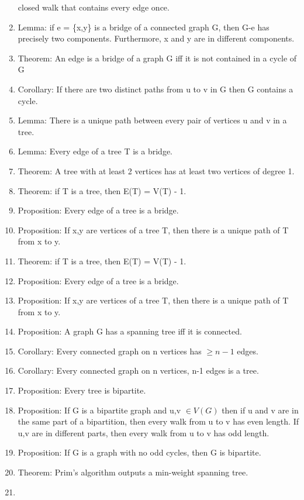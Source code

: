 \documentclass[]{article}
\begin{document}
\begin{enumerate}
  closed walk that contains every edge once.
\item
  Lemma: if e = \{x,y\} is a bridge of a connected graph G, then G-e has
  precisely two components. Furthermore, x and y are in different
  components.
\item
  Theorem: An edge is a bridge of a graph G iff it is not contained in a
  cycle of G
\item
  Corollary: If there are two distinct paths from u to v in G then G
  contains a cycle.
\item
  Lemma: There is a unique path between every pair of vertices u and v
  in a tree.
\item
  Lemma: Every edge of a tree T is a bridge.
\item
  Theorem: A tree with at least 2 vertices has at least two vertices of
  degree 1.
\item
  Theorem: if T is a tree, then \textbar{}E(T)\textbar{} =
  \textbar{}V(T) - 1\textbar{}.
\item
  Proposition: Every edge of a tree is a bridge.
\item
  Proposition: If x,y are vertices of a tree T, then there is a unique
  path of T from x to y.
\item
  Theorem: if T is a tree, then \textbar{}E(T)\textbar{} =
  \textbar{}V(T) - 1\textbar{}.
\item
  Proposition: Every edge of a tree is a bridge.
\item
  Proposition: If x,y are vertices of a tree T, then there is a unique
  path of T from x to y.
\item
  Proposition: A graph G has a spanning tree iff it is connected.
\item
  Corollary: Every connected graph on n vertices has $\geq n-1$ edges.
\item
  Corollary: Every connected graph on n vertices, n-1 edges is a tree.
\item
  Proposition: Every tree is bipartite.
\item
  Proposition: If G is a bipartite graph and u,v $\in V(G)$ then if u
  and v are in the same part of a bipartition, then every walk from u to
  v has even length. If u,v are in different parts, then every walk from
  u to v has odd length.
\item
  Proposition: If G is a graph with no odd cycles, then G is bipartite.
\item
  Theorem: Prim's algorithm outputs a min-weight spanning tree.
\item

\end{enumerate}
\end{document}
